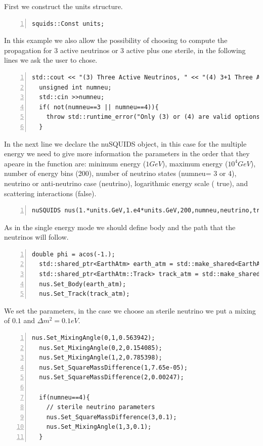 First we construct the units structure.
\begin{lstlisting}[frame=leftline, numbers = left,breaklines=true, label = ex:sin1,firstnumber=last]
  squids::Const units;
\end{lstlisting}
In this example we also allow the possibility of choosing to compute
the propagation for 3 active neutrinos or 3 active plus one sterile,
in the following lines we ask the user to chose.
\begin{lstlisting}[frame=leftline, numbers = left,breaklines=true, label = ex:sin1,firstnumber=last]
  std::cout << "(3) Three Active Neutrinos, " << "(4) 3+1 Three Active and One Sterile Neutrino" << std::endl;
  unsigned int numneu;
  std::cin >>numneu;
  if( not(numneu==3 || numneu==4)){
    throw std::runtime_error("Only (3) or (4) are valid options");
  }
\end{lstlisting}
In the next line we declare the nuSQUIDS object, in this case for the
multiple energy we need to give more information the parameters in the
order that they apeare in the function are: minimum energy ($1GeV$), maximum
energy ($10^4GeV$), number of energy bins (200), number of neutrino
states ({\ttf numneu}= 3 or 4), neutrino or
anti-neutrino case ({\ttf neutrino}), logarithmic energy scale ({\ttf
  true}), and scattering interactions ({\ttf false}).
\begin{lstlisting}[frame=leftline, numbers = left,breaklines=true,
  label = ex:sin1,firstnumber=last]
  nuSQUIDS nus(1.*units.GeV,1.e4*units.GeV,200,numneu,neutrino,true,false);
\end{lstlisting}
As in the single energy mode we should define body and the path that the
neutrinos will follow.  
\begin{lstlisting}[frame=leftline, numbers = left,breaklines=true,
  label = ex:sin1,firstnumber=last]
  double phi = acos(-1.);
  std::shared_ptr<EarthAtm> earth_atm = std::make_shared<EarthAtm>();
  std::shared_ptr<EarthAtm::Track> track_atm = std::make_shared<EarthAtm::Track>(phi);
  nus.Set_Body(earth_atm);
  nus.Set_Track(track_atm);
\end{lstlisting}
We set the parameters, in the case we choose an sterile neutrino we
put a mixing of $0.1$ and $\Delta m^2=0.1eV$.
\begin{lstlisting}[frame=leftline, numbers = left,breaklines=true,label = ex:sin1,firstnumber=last]
  nus.Set_MixingAngle(0,1,0.563942);
  nus.Set_MixingAngle(0,2,0.154085);
  nus.Set_MixingAngle(1,2,0.785398);
  nus.Set_SquareMassDifference(1,7.65e-05);
  nus.Set_SquareMassDifference(2,0.00247);

  if(numneu==4){
    // sterile neutrino parameters
    nus.Set_SquareMassDifference(3,0.1);
    nus.Set_MixingAngle(1,3,0.1);
  }
\end{lstlisting}
